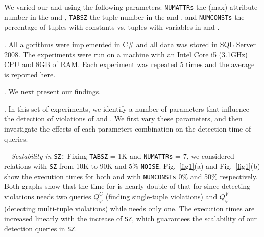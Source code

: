 We varied our \pCFDs and \pCINDs using the following parameters: \texttt{NUMATTRs} the (max) attribute number in the \pCFDs and \pCINDs, \texttt{TABSZ} the tuple number in the \pCFDs and \pCINDs, and \texttt{NUMCONSTs} the percentage of tuples with constants vs. tuples with variables in \pCFDs and \pCINDs.

. All algorithms were implemented in C\# and all data was stored in SQL Server 2008. The experiments were run on a machine with an Intel Core i5 (3.1GHz) CPU and 8GB of RAM. Each experiment was repeated 5 times and the average is reported here.

\begin{figure*}
  \centering
  \caption{Experimental results of detecting \pCFD and \pCIND violations}\label{fig1}
\end{figure*}

. We next present our findings.

. In this set of experiments, we identify a number of parameters that influence the detection of violations of \pCFDs and \pCINDs. We first vary these parameters, and then investigate the effects of each parameters combination on the detection time of queries.

\noindent---\textit{Scalability in} \texttt{SZ:} Fixing \texttt{TABSZ} = 1K and \texttt{NUMATTRs} = 7, we considered relations with \texttt{SZ} from 10K to 90K and 5\% \texttt{NOISE}. Fig.~\ref{fig1}(a) and Fig.~\ref{fig1}(b) show the execution times for both \pCFDs and \pCINDs with \texttt{NUMCONSTs} 0\% and 50\% respectively. Both graphs show that the time for \pCFDs is nearly double of that for \pCINDs since detecting \pCFD violations needs two queries $Q_\varphi^C$ (finding single-tuple violations) and $Q_\varphi^V$ (detecting multi-tuple violations) while \pCIND needs only one. The execution times are increased linearly with the increase of \texttt{SZ}, which guarantees the scalability of our detection queries in \texttt{SZ}.

